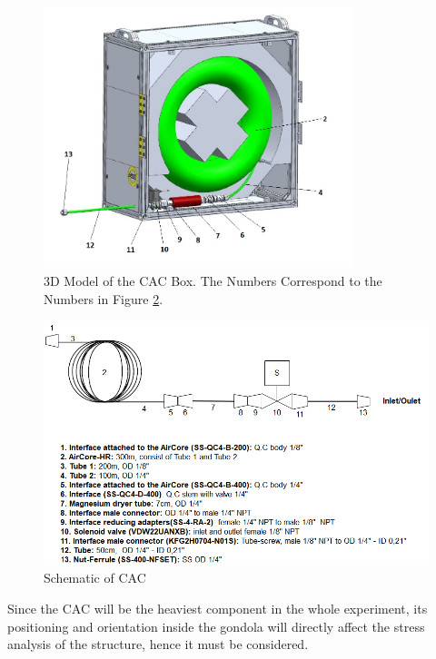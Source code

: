 \begin{figure}[H]
    \centering
    \includegraphics[width=0.8\textwidth]{4-experiment-design/img/Mechanical/CAC_interior_labels.jpg}
    \caption{3D Model of the CAC Box. The Numbers Correspond to the Numbers in Figure \ref{fig:CAC-schematic}.}
    \label{fig:CAC-cad-model}
\end{figure}

\begin{figure}[H]
    \centering
    \includegraphics[width=1\textwidth]{4-experiment-design/img/CAC-schematic-v3.PNG}
    \caption{Schematic of CAC}
    \label{fig:CAC-schematic}
\end{figure}

Since the CAC will be the heaviest component in the whole experiment, its positioning and orientation inside the gondola will directly affect the stress analysis of the structure, hence it must be considered.

